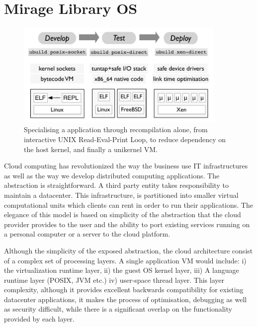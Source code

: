 \section{Mirage Library OS} \label{sec:mirage-intro}

\begin{figure}
\includegraphics[width=0.9\textwidth]{mirage-toolchain}
\caption{Specialising a \mirage application through recompilation alone, from
  interactive UNIX Read-Eval-Print Loop, to reduce dependency on the host
  kernel, and finally a unikernel VM.}
\label{fig:mirage-toolchain}
\end{figure}

Cloud computing has revolutionized the way the business use IT infrastructures
as well as the way we develop distributed computing applications. The
abstraction is straightforward. A third party entity takes responsibility to
maintain a datacenter. This infrastructure, is partitioned into smaller virtual
computational units which clients can rent in order to run their applications.
The elegance of this model is based on simplicity of the abstraction that the
cloud provider provides to the user and the ability to port existing services
running on a personal computer or a server to the cloud platform. 

Although the simplicity of the exposed abstraction, the cloud architecture
consist of a complex set of processing layers. A single application VM would
include: i) the virtualization runtime layer, ii) the guest OS kernel layer,
iii) A language runtime layer (POSIX, JVM etc.) iv) user-space
thread layer. This layer complexity, although it provides excellent backwards
compatibility for existing datacenter applications, it makes the process of
optimisation, debugging as well as security difficult, while there is a
significant overlap on the functionality provided by each layer. 

